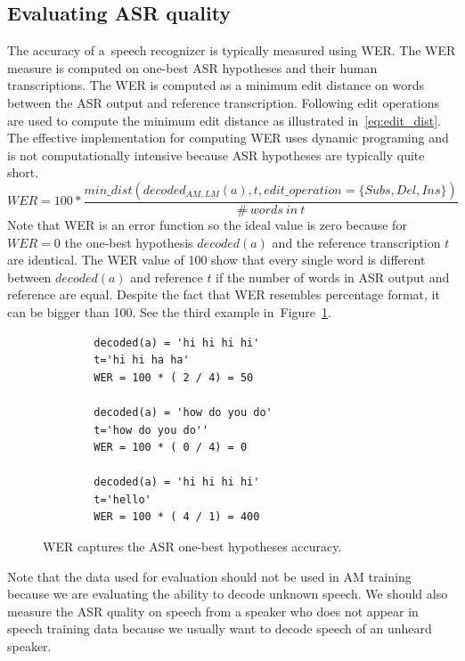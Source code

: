 \subsection[Evaluating \acs{ASR} quality]{Evaluating \acl{ASR} quality}
\label{sub:eval}
The accuracy of a~speech recognizer is typically measured using \acl{WER}.
The \ac{WER} measure is computed on one-best \ac{ASR} hypotheses and their human transcriptions.
The \ac{WER} is computed as a minimum edit distance on words between the \ac{ASR} output and reference transcription.
Following edit operations are used  to compute the minimum edit distance as illustrated in~\ref{eq:edit_dist}.
The effective implementation for computing WER uses dynamic programing and is not computationally intensive because \ac{ASR} hypotheses are typically quite short.
\begin{equation} \label{eq:edit_dist}
    WER = 100* \frac{min\_dist(decoded_{AM, LM}(a), t, edit\_operation=\{Subs, Del, Ins\})}{\#\ words\ in\ t}
\end{equation}
Note that \ac{WER} is an error function so the ideal value is zero because for $WER=0$ the one-best hypothesis $decoded(a)$ and the reference transcription $t$ are identical.
The \ac{WER} value of 100 show that every single word is different between $decoded(a)$ and reference $t$ if the number of words in \ac{ASR} output and reference are equal.
Despite the fact that \ac{WER} resembles percentage format, it can be bigger than 100. 
See the third example in~Figure~\ref{fig:wer400}.
\begin{figure}[!htp]
    \begin{center}
    \begin{verbatim}
        decoded(a) = 'hi hi hi hi'
        t='hi hi ha ha'
        WER = 100 * ( 2 / 4) = 50 

        decoded(a) = 'how do you do'
        t='how do you do''
        WER = 100 * ( 0 / 4) = 0

        decoded(a) = 'hi hi hi hi'
        t='hello'
        WER = 100 * ( 4 / 1) = 400
    \end{verbatim}
    \caption{\acs{WER} captures the \ac{ASR} one-best hypotheses accuracy.}
    \label{fig:wer400} 
    \end{center}
\end{figure}

Note that the data used for evaluation should not be used in \ac{AM} training because we are evaluating the ability to decode unknown speech.
We should also measure the \ac{ASR} quality on speech from a speaker who does not appear in speech training data because we usually want to decode speech of an unheard speaker.

